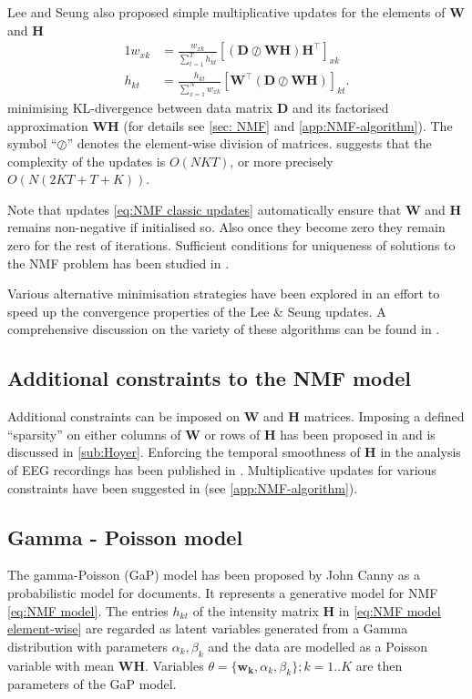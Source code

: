 Lee and Seung also proposed simple multiplicative updates \cite{Lee2001} for the elements of $\bm{W}$ and $\bm{H}$
%
\begin{alignat}{1}
	w_{xk} & =\frac{w_{xk}}{\sum_{t=1}^{T}h_{kt}}\left[(\bm{D}\oslash\bm{WH})\bm{H^{\top}}\right]_{xk}\nonumber \\
	h_{kt} & =\frac{h_{kt}}{\sum_{x=1}^{N}w_{xk}}\left[\bm{W^{\top}}(\bm{D}\oslash\bm{WH})\right]_{kt}.
	\label{eq:NMF classic updates}
\end{alignat}
%
minimising KL-divergence between data matrix $\bm{D}$ and its factorised approximation $\bm{WH}$ (for details see \autoref{sec: NMF} and \autoref{app:NMF-algorithm}). The symbol ``$\oslash$'' denotes the element-wise division of matrices.  suggests that the complexity of the updates is $O\left(NKT\right)$, or more precisely $O\left(N(2KT+T+K)\right)$.

Note that updates \autoref{eq:NMF classic updates} automatically ensure that $\bm{W}$ and $\bm{H}$ remains non-negative if initialised so. Also once they become zero they remain zero for the rest of iterations. Sufficient conditions for uniqueness of solutions to the NMF problem has been studied in \cite{Donoho2004}. 

Various alternative minimisation strategies have been explored in an effort to speed up the convergence properties of the Lee \& Seung updates. A comprehensive discussion on the variety of these algorithms can be found in \cite{Berry2007}. 


\subsection{Additional constraints to the NMF model \label{sub:NMF constrains}}
Additional constraints can be imposed on $\bm{W}$ and $\bm{H}$ matrices. Imposing a defined ``sparsity'' on either columns of $\bm{W}$ or rows of $\bm{H}$ has been proposed in \cite{Hoyer2004} and is discussed in \autoref{sub:Hoyer}. Enforcing the temporal smoothness of $\bm{H}$ in the analysis of EEG recordings has been published in \cite{Chen2005}. Multiplicative updates for various constraints have been suggested in \cite{Chen2005,Pauca2006}  (see \autoref{app:NMF-algorithm}).


\subsection{Gamma - Poisson model \label{sub:GaP}}
The gamma-Poisson (GaP) model has been proposed by John Canny \cite{Canny2004} as a probabilistic model for documents. It represents a generative model for NMF \autoref{eq:NMF model}. The entries $h_{kt}$ of the intensity matrix $\bm{H}$ in \autoref{eq:NMF model element-wise} are regarded as latent variables generated from a Gamma distribution with parameters $\alpha_k, \beta_k$ and the data are modelled as a Poisson variable with mean $\bm{WH}$. Variables $\theta = \{\bm{w_k},\alpha_k, \beta_k\}; k = 1..K$ are then parameters of the GaP model.

